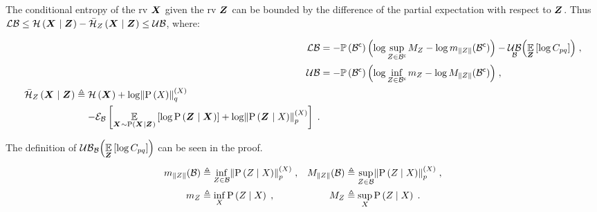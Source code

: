 \begin{theorem}
	\label{thm:entropy_bounds}
	The conditional entropy of the \gls{rv} $\boldsymbol X_{}$ given the \gls{rv} $\boldsymbol Z_{}$ can be bounded by the difference of the partial expectation with respect to $\boldsymbol Z_{}$. Thus $\operatorname*{\mathcal{LB}}\leq\mathcal{H}\left({\boldsymbol X_{}}\mid{\ensuremath{\boldsymbol Z_{}}}\right)-\bar{\mathcal{H}}_{Z_{}}\left({\boldsymbol X_{}}\mid{\ensuremath{\boldsymbol Z_{}}}\right)\leq\operatorname*{\mathcal{UB}}$, where:
	\begin{small}
		\begin{subequations}
			\begin{align}
				\lowerbound&=-\measure{\stcomp{\subSpace}}\Bigl(\log\sup_{\observations{}\in\stcomp{\subSpace}}M_{\observations{}}-\log m_{\norm{\observations{}}}(\stcomp{\subSpace})\Bigr)-\upperbound_\subSpace\Bigl(\expectation{\log C_{pq}}{\observationsRV{}}\Bigr)\;,
				\\
				\upperbound& =-\measure{\stcomp{\subSpace}}\Bigl(\log\inf_{\observations{}\in\stcomp{\subSpace}}m_{\observations{}}-\log M_{\norm{\observations{}}}(\stcomp{\subSpace})\Bigr)\;,\\
				\begin{split}
					\simplecondEntropy{\statesRV{}}{\observationsRV{}}{\observations{}}&\triangleq\entropy{\statesRV{}}+\log\pnorm{\prob{\states{}}}{q}{\states{}}\\
					&\phantomeq-\partialexpectation{\expectation{\log\probcond{\observationsRV{}}{\statesRV{}}}{\statesRV{}\sim\probcond{\statesRV{}}{\observationsRV{}}}+\log\pnorm{\probcond{\observationsRV{}}{\states{}}}{p}{\states{}}}{\subSpace}\;.
				\end{split}
			\end{align}
		\end{subequations}
	\end{small}
	The definition of $\operatorname*{\mathcal{UB}}_{\mathcal B}\Bigl(\operatorname*{\mathbb{E}}\limits_{\boldsymbol Z_{}}\left[{\log C_{pq}}\right]\Bigr)$ can be seen in the proof.
	\begin{align*}
		m_{\norm{\observations{}}}(\subSpace) &\triangleq\inf_{\observations{}\in\subSpace}\pnorm{\probcond{\observations{}}{\states{}}}{p}{\states{}}\;,&M_{\norm{\observations{}}}(\subSpace) &\triangleq\sup_{\observations{}\in\subSpace}\pnorm{\probcond{\observations{}}{\states{}}}{p}{\states{}}\;,\\
		m_{\observations{}}&\triangleq\inf_{\states{}}\probcond{\observations{}}{\states{}}\;,&M_{\observations{}}&\triangleq\sup_{\states{}}\probcond{\observations{}}{\states{}}\;.
	\end{align*}
\end{theorem}
